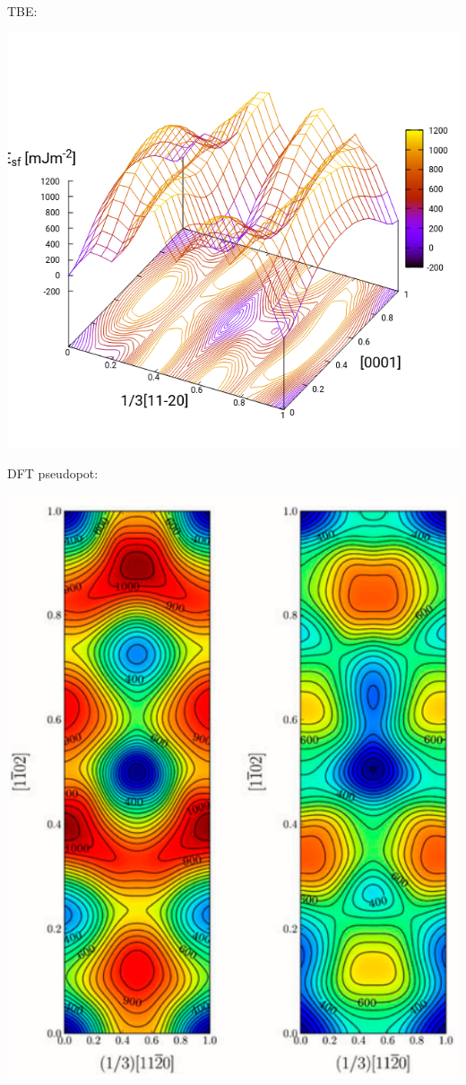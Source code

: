 \documentclass[11pt]{article}
\begin{document}
TBE:
\begin{center}
\includegraphics[width=.9\linewidth]{Images/pyramidal_gs_noo_2019-11-08_alat.png}
\end{center}

DFT pseudopot:
\begin{center}
\includegraphics[width=.9\linewidth]{Images/pyramidal_gamma_surface_ready_data_both.png}
\end{center}
\end{document}
